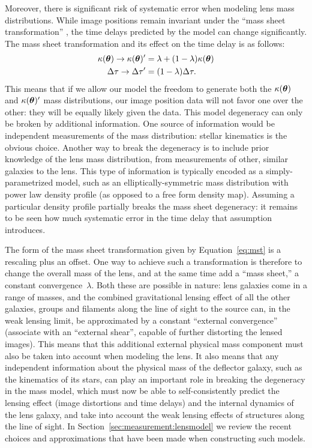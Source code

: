 Moreover, there is significant risk of systematic error when modeling
lens mass distributions. While image positions remain invariant under
the ``mass sheet transformation'' \citep{MSD} \citep[and its generalization, the source size transformation]{SST}, the time delays
predicted by the model can change significantly. The mass sheet transformation
and its effect on the time delay is as follows:
\begin{align}
    \kappa(\boldsymbol{\theta}) \rightarrow \kappa(\boldsymbol{\theta})' &= \lambda + (1 - \lambda) \kappa(\boldsymbol{\theta})  \label{eq:mst} \\
    \Delta \tau \rightarrow \Delta \tau' &=  (1 - \lambda) \Delta \tau.
\end{align}
This means that if we allow our model the freedom to generate both the
$\kappa(\boldsymbol{\theta})$ and $\kappa(\boldsymbol{\theta})'$ mass distributions, our image position
data will not favor one over the other: they will be equally likely
given the data. This model degeneracy can only be broken by additional
information. One source of information would be independent measurements
of the mass distribution: stellar kinematics is the obvious choice.
Another way to break the degeneracy is to include prior knowledge of the
lens mass distribution, from measurements of other, similar galaxies to
the lens. This type of information is typically encoded as a
simply-parametrized model, such as an elliptically-symmetric mass
distribution with power law density profile (as opposed to a free form
density map). Assuming a particular density profile partially breaks the
mass sheet degeneracy: it remains to be seen how much systematic error
in the time delay that assumption introduces.


The form of the mass sheet transformation given by Equation~\ref{eq:mst}
is a rescaling plus an offset. One way to achieve such a transformation
is therefore to change the overall mass of the lens,  and at the same
time add a ``mass sheet,'' a constant convergence~$\lambda$.  Both these are
possible in nature: lens galaxies come in a range of masses, and  the
combined gravitational lensing effect of all the other galaxies, groups
and filaments along  the line of sight to the source can, in the weak
lensing limit, be approximated by a constant ``external convergence''
(associate with an ``external shear'', capable of further distorting the
lensed images). This means that this additional external physical mass
component must also be taken into account when modeling the lens. It
also means that any independent information about  the physical mass of
the deflector galaxy, such as the kinematics of its  stars, can play an
important role in breaking the degeneracy in the mass model, which must
now be able to self-consistently predict the lensing effect
(image distortions and time delays) and the internal dynamics of the lens
galaxy, and take into account the weak lensing effects of structures
along the line of sight.
In Section~\ref{sec:measurement:lensmodel} we review the
recent choices and approximations that have been made when constructing
such models.


